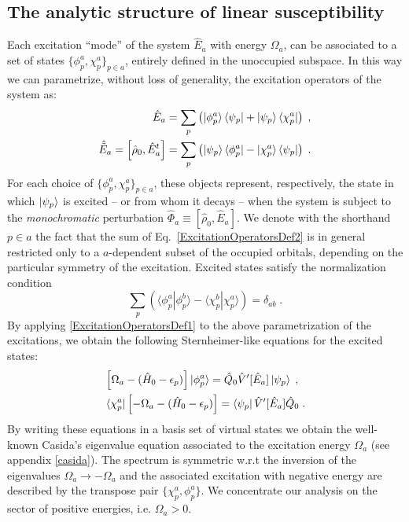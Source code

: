 \documentclass[reprint,aps,prb]{revtex4-1}
\newcommand{\eps}{\epsilon}
\newcommand{\be}{\begin{equation}}
\newcommand{\ee}{\end{equation}}
\newcommand{\nn}{\notag}
\newcommand{\lb}{\label}
\newcommand{\op}[1]{\hat {#1}}
\newcommand{\commutator}[2]{\left[ {#1} , {#2} \right]}
\newcommand{\brket}[2]{\langle  #1 | #2 \rangle} %
\newcommand{\dmnot}{\op{\rho}_0}
\newcommand{\hnot}{\op{H}_0}
\begin{document}
\subsection{The analytic structure of linear susceptibility}
Each excitation ``mode'' of the system $\op E_a$ with energy $\Omega_a$, can be associated to a set of states $\{\phi^a_p,\chi^a_p\}_{p \in a}$,
entirely defined in the unoccupied subspace. 
In this way we can parametrize, without loss of generality, the excitation operators of the system as:
\begin{align}\lb{ExcitationOperatorsDef2}
\op E_a &= \sum_p \left( \ket{\phi^a_p}\bra{\psi_p} + \ket{\psi_p} \bra{\chi^a_p}\right)\;, \nn \\
\op{\tilde E}_a = \commutator{\dmnot}{\op E^t_a} &= \sum_p \left( \ket{\psi_p}\bra{\phi^a_p} - \ket{\chi^a_p} \bra{\psi_p}\right)\;.
\end{align}
For each choice of $\{\phi^a_p,\chi^a_p\}_{p \in a}$, these objects represent, respectively, the state in which $\ket{\psi_p}$
is excited -- or from whom it decays -- when the system is subject to the \emph{monochromatic} perturbation $\op \Phi_a \equiv \commutator{\dmnot}{\op E_a}$.
We denote with the shorthand $p \in a$ the fact that the sum of Eq.~\eqref{ExcitationOperatorsDef2}
is in general restricted only to a $a$-dependent subset of the occupied orbitals, depending on the particular symmetry 
of the excitation.
Excited states  satisfy the normalization condition
\be\lb{ExcitedStateOrthNormDef1}
\sum_p \left(\brket{\phi_p^a}{\phi_p^b} - \brket{\chi_p^b}{\chi_p^a}\right) = \delta_{ab} \;. 
\ee
By applying \eqref{ExcitationOperatorsDef1} to the above parametrization
of the excitations, we obtain the following Sternheimer-like equations for the excited states:
\begin{align}\lb{ExcitationOperatorsDef3}
&\left[\Omega_a-(\hnot - \eps_p)\right] \ket{\phi_p^a} = \op Q_0 \op V'[\op E_a] \ket{\psi_p} \;, \nn\\
&\bra{\chi_p^a}\left[-\Omega_a-(\hnot - \eps_p)\right] = \bra{\psi_p} \op V'[\op E_a] \op Q_0  \;.
\end{align}
By writing these equations in a basis set of virtual states we obtain the well-known Casida's eigenvalue equation\cite{CasidaBook}
associated to the excitation energy $\Omega_a$ (see appendix \ref{casida}).
The spectrum is symmetric w.r.t the inversion of the eigenvalues 
$\Omega_a \rightarrow -\Omega_a$ and the associated excitation with negative energy are described by the transpose pair $\{\chi^a_p,\phi^a_p\}$.
We concentrate our analysis on the sector of positive energies, i.e. $\Omega_a > 0$.
\end{document}
